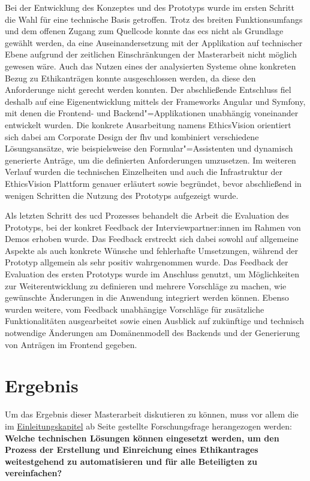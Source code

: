 \documentclass[a4paper,12pt,twoside]{scrreprt}
\begin{document}
Bei der Entwicklung des Konzeptes und des Prototyps wurde im ersten Schritt die Wahl für eine technische Basis getroffen. Trotz des breiten Funktionsumfangs und dem offenen Zugang zum Quellcode konnte das \ac{ecs} nicht als Grundlage gewählt werden, da eine Auseinandersetzung mit der Applikation auf technischer Ebene aufgrund der zeitlichen Einschränkungen der Masterarbeit nicht möglich gewesen wäre. Auch das Nutzen eines der analysierten Systeme ohne konkreten Bezug zu Ethikanträgen konnte ausgeschlossen werden, da diese den Anforderunge nicht gerecht werden konnten. Der abschließende Entschluss fiel deshalb auf eine Eigenentwicklung mittels der Frameworks Angular und Symfony, mit denen die Frontend- und Backend"=Applikationen unabhängig voneinander entwickelt wurden. Die konkrete Ausarbeitung namens EthicsVision orientiert sich dabei am Corporate Design der \ac{fhv} und kombiniert verschiedene Lösungsansätze, wie beispielsweise den Formular"=Assistenten und dynamisch generierte Anträge, um die definierten Anforderungen umzusetzen. Im weiteren Verlauf wurden die technischen Einzelheiten und auch die Infrastruktur der EthicsVision Plattform genauer erläutert sowie begründet, bevor abschließend in wenigen Schritten die Nutzung des Prototyps aufgezeigt wurde.

\medskip

Als letzten Schritt des \ac{ucd} Prozesses behandelt die Arbeit die Evaluation des Prototyps, bei der konkret Feedback der Interviewpartner:innen im Rahmen von Demos erhoben wurde. Das Feedback erstreckt sich dabei sowohl auf allgemeine Aspekte als auch konkrete Wünsche und fehlerhafte Umsetzungen, während der Prototyp allgemein als sehr positiv wahrgenommen wurde. Das Feedback der Evaluation des ersten Prototyps wurde im Anschluss genutzt, um Möglichkeiten zur Weiterentwicklung zu definieren und mehrere Vorschläge zu machen, wie gewünschte Änderungen in die Anwendung integriert werden können. Ebenso wurden weitere, vom Feedback unabhängige Vorschläge für zusätzliche Funktionalitäten ausgearbeitet sowie einen Ausblick auf zukünftige und technisch notwendige Änderungen am Domänenmodell des Backends und der Generierung von Anträgen im Frontend gegeben.

\section{Ergebnis}
\label{sec:ergebnis}

Um das Ergebnis dieser Masterarbeit diskutieren zu können, muss vor allem die im \hyperref[chap:einleitung]{Einleitungskapitel} ab Seite \pageref{chap:einleitung} gestellte Forschungsfrage herangezogen werden:\newline
\textbf{Welche technischen Lösungen können eingesetzt werden, um den Prozess der Erstellung und Einreichung eines Ethikantrages weitestgehend zu automatisieren und für alle Beteiligten zu vereinfachen?}
\end{document}
